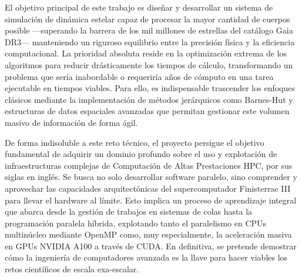 El objetivo principal de este trabajo es diseñar y desarrollar un sistema de simulación de dinámica estelar capaz de procesar la mayor cantidad de cuerpos posible —superando la barrera de los mil millones de estrellas del catálogo Gaia DR3— manteniendo un riguroso equilibrio entre la precisión física y la eficiencia computacional.
La prioridad absoluta reside en la optimización extrema de los algoritmos para reducir drásticamente los tiempos de cálculo, transformando un problema que sería inabordable o requeriría años de cómputo en una tarea ejecutable en tiempos viables.
Para ello, es indispensable trascender los enfoques clásicos mediante la implementación de métodos jerárquicos como Barnes-Hut y estructuras de datos espaciales avanzadas que permitan gestionar este volumen masivo de información de forma ágil.

De forma indisoluble a este reto técnico, el proyecto persigue el objetivo fundamental de adquirir un dominio profundo sobre el uso y explotación de infraestructuras complejas de Computación de Altas Prestaciones HPC, por sus siglas en inglés.
Se busca no solo desarrollar software paralelo, sino comprender y aprovechar las capacidades arquitectónicas del supercomputador Finisterrae III para llevar el hardware al límite.
Esto implica un proceso de aprendizaje integral que abarca desde la gestión de trabajos en sistemas de colas hasta la programación paralela híbrida, explotando tanto el paralelismo en CPUs multinúcleo mediante OpenMP como, muy especialmente, la aceleración masiva en GPUs NVIDIA A100 a través de CUDA.
En definitiva, se pretende demostrar cómo la ingeniería de computadores avanzada es la llave para hacer viables los retos científicos de escala exa-escalar.

